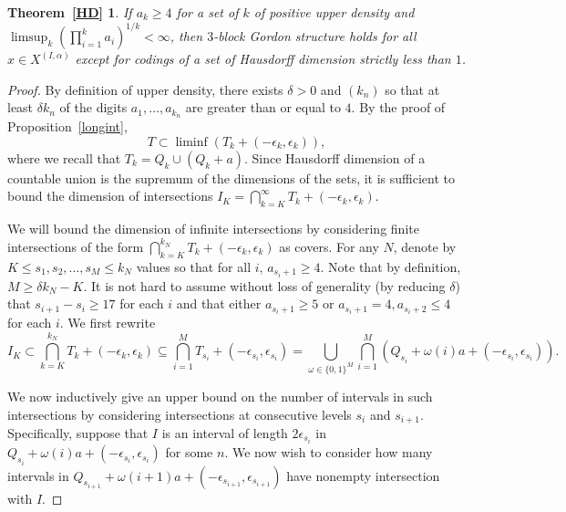 \documentclass[11pt,reqno]{amsart}
\newtheorem*{T1}{Theorem~\ref{HD}}
\theoremstyle{definition}
\theoremstyle{plain}
\begin{document}
\begin{T1}
If $a_k \geq 4$ for a set of $k$ of positive upper density and $\limsup_k \left(\prod_{i=1}^k a_i\right)^{1/k} < \infty$, then $3$-block Gordon structure holds for all $x \in X^{(I,\alpha)}$ except for codings of a set 
of Hausdorff dimension strictly less than $1$.
\end{T1}

\begin{proof}
By definition of upper density, there exists $\delta > 0$ and $(k_n)$ so that at least $\delta k_n$ of the digits
$a_1, \ldots, a_{k_n}$ are greater than or equal to $4$. %
By the proof of Proposition~\ref{longint}, 
\[
T \subset \liminf (T_k + (-\epsilon_k, \epsilon_k)),
\]
where we recall that $T_k = Q_k \cup (Q_k + a)$. Since Hausdorff dimension of a countable union is the supremum of the dimensions of the sets, it is sufficient to bound the dimension of intersections $I_K = \bigcap_{k = K}^{\infty} 
T_{k} + (-\epsilon_k, \epsilon_k)$. 

We will bound the dimension of infinite intersections by considering finite intersections of the form
$\bigcap_{k=K}^{k_N} T_k + (-\epsilon_k, \epsilon_k)$ as covers. For any $N$, denote by $K \leq s_1, s_2, \ldots, s_M \leq k_N$ values so that for all
$i$, $a_{s_i + 1} \geq 4$. Note that by definition, $M \geq \delta k_N - K$. It is not hard to assume without loss of generality (by reducing $\delta$) that $s_{i+1} - s_i \geq 17$ for each $i$ and that either $a_{s_i+1} \geq 5$ or $a_{s_i + 1} = 4, a_{s_i + 2} \leq 4$ for each $i$. We first rewrite 
\[
I_K \subset \bigcap_{k = K}^{k_N} T_{k} + (-\epsilon_{k}, \epsilon_{k}) \subseteq
\bigcap_{i = 1}^{M} T_{s_i} + (-\epsilon_{s_i}, \epsilon_{s_i}) = 
\bigcup_{\omega \in \{0,1\}^{M}} \bigcap_{i = 1}^{M} (Q_{s_i} + \omega(i) a + (-\epsilon_{s_i}, \epsilon_{s_i})).
\]

We now inductively give an upper bound on the number of intervals in such intersections by considering intersections at consecutive levels $s_i$ and $s_{i+1}$. Specifically, suppose that $I$ is an interval of length $2\epsilon_{s_i}$ in 
$Q_{s_i} + \omega(i) a + (-\epsilon_{s_i}, \epsilon_{s_i})$ for some $n$. 
We now wish to consider how many intervals in $Q_{s_{i+1}} + \omega(i+1) a + (-\epsilon_{s_{i+1}}, \epsilon_{s_{i+1}})$ have nonempty intersection with $I$. 


\end{proof}
\end{document}
